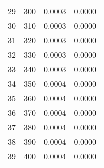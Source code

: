 \begin{table}[H]
\begin{tabular}{cccc}
\cline{1-4}
29 & 300 & 0.0003 & 0.0000 \\
\cline{1-4}
30 & 310 & 0.0003 & 0.0000 \\
\cline{1-4}
31 & 320 & 0.0003 & 0.0000 \\
\cline{1-4}
32 & 330 & 0.0003 & 0.0000 \\
\cline{1-4}
33 & 340 & 0.0003 & 0.0000 \\
\cline{1-4}
34 & 350 & 0.0004 & 0.0000 \\
\cline{1-4}
35 & 360 & 0.0004 & 0.0000 \\
\cline{1-4}
36 & 370 & 0.0004 & 0.0000 \\
\cline{1-4}
37 & 380 & 0.0004 & 0.0000 \\
\cline{1-4}
38 & 390 & 0.0004 & 0.0000 \\
\cline{1-4}
39 & 400 & 0.0004 & 0.0000 \\
\cline{1-4}
\end{tabular}
\end{table}

